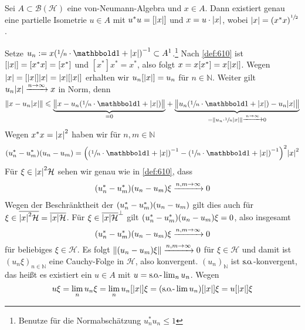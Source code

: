 \begin{satz}[{name={Polarzerlegung}}]
	Sei $A \subset \mathcal{B}(\mathcal{H})$ eine von-Neumann-Algebra und $x \in A$.
	Dann existiert genau eine partielle Isometrie $u \in A$ mit $u^*u=[\abs*{x}]$ und $x=u \cdot \abs*{x}$, wobei $\abs*{x}=\enbrace*{x^*x}^{\sfrac{1}{2}}$.
\end{satz}
\begin{beweis}
	Setze $u_n := x\enbrace*{\sfrac{1}{n} \cdot \ind + \abs*{x}}^{-1} \subset A^1$.\footnote{Benutze für die Normabschätzung $u_n^* u_n \le 1$}
	Nach \autoref{def:610} ist $[\abs*{x}]=[x^*x]= [x^*]$ und $[x^*]x^*=x^*$, also folgt $x=x[x^*]=x [\abs*{x}]$.
	Wegen $\abs*{x} = [\abs*{x}] \abs*{x}= \abs*{x} [\abs*{x} ]$ erhalten wir  $u_n [\abs*{x}]= u_n$ für $n \in \mathbb{N}$.
	Weiter gilt $u_n \abs*{x} \grenzw{n \to \infty} x$ in Norm, denn 
	\begin{align}
		\norm*{x-u_n \abs*{x}} \le \Underbrace{\norm[\big]{x- u_n \enbrace*{\sfrac{1}{n}\cdot \ind + \abs*{x} }}}{=0} + \Underbrace{\norm[\big]{ u_n \enbrace*{\sfrac{1}{n} \cdot \ind + \abs*{x}} - u_n \abs*{x}}}{= \norm*{u_n \cdot \sfrac{1}{n} \abs*{x}} \grenzw{n \to \infty} 0}
	\end{align}
	Wegen $x^*x= \abs*{x}^2$ haben wir für $n,m \in \mathbb{N}$
	\begin{align}
		\enbrace*{u_n^*- u_m^*} (u_n - u_m) = \enbrace*{ \enbrace*{\sfrac{1}{n} \cdot \ind + \abs*{x}}^{-1} - \enbrace*{\sfrac{1}{n} \cdot \ind + \abs*{x}}^{-1}}^2 \abs*{x}^2 
	\end{align}
	Für $\xi \in \abs*{x}^2 \mathcal{H}$ sehen wir genau wie in \autoref{def:610}, dass
	\begin{align}
		\enbrace*{u_n^*- u_m^*} (u_n - u_m) \xi \grenzw{n,m \to \infty} 0
	\end{align}
	Wegen der Beschränktheit der $\enbrace*{u_n^*- u_m^*} (u_n - u_m)$ gilt dies auch für $\xi \in \overline{\abs*{x}^2 \mathcal{H}} = \overline{\abs*{x} \mathcal{H}}$.
	Für $\xi \in \overline{\abs*{x}\mathcal{H}}^\bot$ gilt $\enbrace*{u_n^*- u_m^*} (u_n - u_m)\xi=0$, also insgesamt
	\[
		\enbrace*{u_n^*- u_m^*} (u_n - u_m) \xi \grenzw{n,m \to \infty} 0
	\]
	für beliebiges $\xi \in \mathcal{H}$.
	Es folgt $\norm*{(u_n-u_m)\xi} \grenzw{\raisemath{-3pt}{n,m \to \infty}} 0$ für $\xi \in \mathcal{H}$ und damit ist $(u_n \xi)_{n \in \mathbb{N}}$ eine Cauchy-Folge in $\mathcal{H}$, also konvergent.
	$(u_n)_\mathbb{N}$ ist $\so$-konvergent, das heißt es existiert ein $u \in A$ mit $u = \solim_n u_n$.
	Wegen 
	\[
		u \xi = \lim_n u_n \xi = \lim_n u_n [\abs{x}] \xi =  \enbrace*{\solim u_n} [\abs*{x}] \xi = u [\abs*{x}] \xi
\]
\end{beweis}
